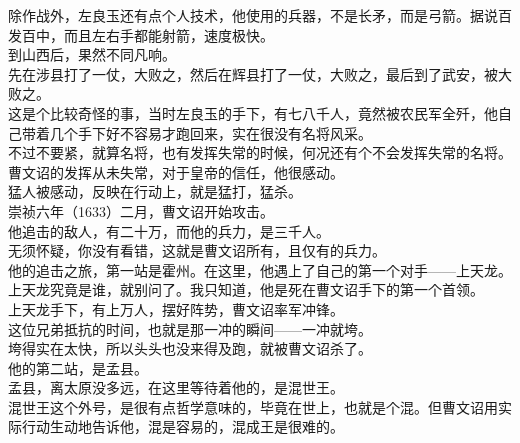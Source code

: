 \begin{multicols}{\theparacolNo}
除作战外，左良玉还有点个人技术，他使用的兵器，不是长矛，而是弓箭。据说百发百中，而且左右手都能射箭，速度极快。\\

到山西后，果然不同凡响。\\

先在涉县打了一仗，大败之，然后在辉县打了一仗，大败之，最后到了武安，被大败之。\\

这是个比较奇怪的事，当时左良玉的手下，有七八千人，竟然被农民军全歼，他自己带着几个手下好不容易才跑回来，实在很没有名将风采。\\

不过不要紧，就算名将，也有发挥失常的时候，何况还有个不会发挥失常的名将。\\

曹文诏的发挥从未失常，对于皇帝的信任，他很感动。\\

猛人被感动，反映在行动上，就是猛打，猛杀。\\

崇祯六年（1633）二月，曹文诏开始攻击。\\

他追击的敌人，有二十万，而他的兵力，是三千人。\\

无须怀疑，你没有看错，这就是曹文诏所有，且仅有的兵力。\\

他的追击之旅，第一站是霍州。在这里，他遇上了自己的第一个对手——上天龙。\\

上天龙究竟是谁，就别问了。我只知道，他是死在曹文诏手下的第一个首领。\\

上天龙手下，有上万人，摆好阵势，曹文诏率军冲锋。\\

这位兄弟抵抗的时间，也就是那一冲的瞬间——一冲就垮。\\

垮得实在太快，所以头头也没来得及跑，就被曹文诏杀了。\\

他的第二站，是孟县。\\

孟县，离太原没多远，在这里等待着他的，是混世王。\\

混世王这个外号，是很有点哲学意味的，毕竟在世上，也就是个混。但曹文诏用实际行动生动地告诉他，混是容易的，混成王是很难的。\\


\end{multicols}
